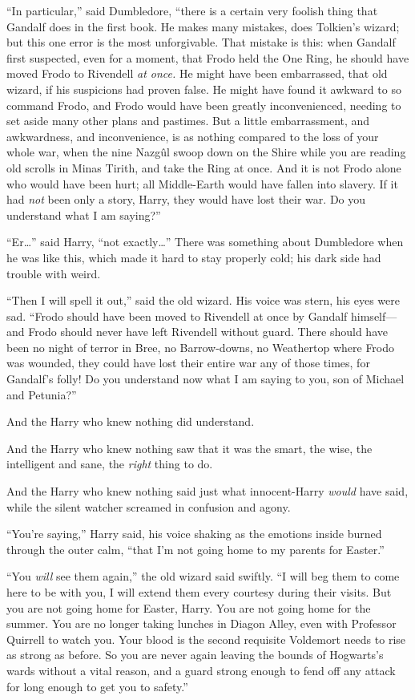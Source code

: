 “In particular,” said Dumbledore, “there is a certain very foolish thing that Gandalf does in the first book. He makes many mistakes, does Tolkien’s wizard; but this one error is the most unforgivable. That mistake is this: when Gandalf first suspected, even for a moment, that Frodo held the One Ring, he should have moved Frodo to Rivendell \emph{at once.} He might have been embarrassed, that old wizard, if his suspicions had proven false. He might have found it awkward to so command Frodo, and Frodo would have been greatly inconvenienced, needing to set aside many other plans and pastimes. But a little embarrassment, and awkwardness, and inconvenience, is as nothing compared to the loss of your whole war, when the nine Nazgûl swoop down on the Shire while you are reading old scrolls in Minas Tirith, and take the Ring at once. And it is not Frodo alone who would have been hurt; all Middle-Earth would have fallen into slavery. If it had \emph{not} been only a story, Harry, they would have lost their war. Do you understand what I am saying?”

“Er…” said Harry, “not exactly…” There was something about Dumbledore when he was like this, which made it hard to stay properly cold; his dark side had trouble with weird.

“Then I will spell it out,” said the old wizard. His voice was stern, his eyes were sad. “Frodo should have been moved to Rivendell at once by Gandalf himself—and Frodo should never have left Rivendell without guard. There should have been no night of terror in Bree, no Barrow-downs, no Weathertop where Frodo was wounded, they could have lost their entire war any of those times, for Gandalf’s folly! Do you understand now what I am saying to you, son of Michael and Petunia?”

And the Harry who knew nothing did understand.

And the Harry who knew nothing saw that it was the smart, the wise, the intelligent and sane, the \emph{right} thing to do.

And the Harry who knew nothing said just what innocent-Harry \emph{would} have said, while the silent watcher screamed in confusion and agony.

“You’re saying,” Harry said, his voice shaking as the emotions inside burned through the outer calm, “that I’m not going home to my parents for Easter.”

“You \emph{will} see them again,” the old wizard said swiftly. “I will beg them to come here to be with you, I will extend them every courtesy during their visits. But you are not going home for Easter, Harry. You are not going home for the summer. You are no longer taking lunches in Diagon Alley, even with Professor Quirrell to watch you. Your blood is the second requisite Voldemort needs to rise as strong as before. So you are never again leaving the bounds of Hogwarts’s wards without a vital reason, and a guard strong enough to fend off any attack for long enough to get you to safety.”

